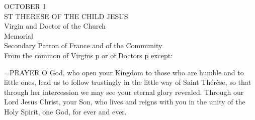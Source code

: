 \begin{center}\normalsize OCTOBER 1\\
\footnotesize ST THERESE OF THE CHILD JESUS\\
\footnotesize Virgin and Doctor of the Church\\
\footnotesize Memorial\\
\footnotesize Secondary Patron of France and of the Community\\
\footnotesize From the common of Virgins p or of Doctors p except:\\
\end{center}

\hangindent=\parindent \small{PRAYER 
O God, who open your Kingdom
to those who are humble and to little ones,
lead us to follow trustingly in the little way of Saint Thérèse,
so that through her intercession
we may see your eternal glory revealed.
Through our Lord Jesus Christ, your Son,
who lives and reigns with you in the unity of the Holy Spirit,
one God, for ever and ever.\\}
 
